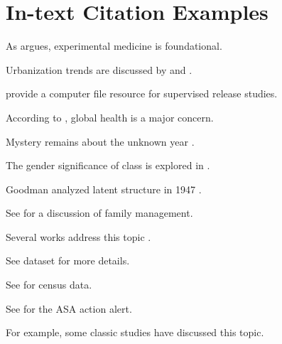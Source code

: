 \documentclass{article}
\begin{document}
\nocite{*} %


\section*{In-text Citation Examples}

As \textcite{bernard1957} argues, experimental medicine is foundational.

Urbanization trends are discussed by \textcite{lee2021a} and \textcite{lee2021b}.

\textcite{deschenes2000} provide a computer file resource for supervised release studies.

According to \textcite{who2022}, global health is a major concern.

Mystery remains about the unknown year \parencite{doe_nodate}.

The gender significance of class is explored in \textcite{szelenyiForthcoming}.

Goodman analyzed latent structure in 1947 \parencite{goodman1947a, goodman1947b}.

See \parencite[pp.~63--93]{sampson1992} for a discussion of family management.

Several works address this topic \parencite{brown2022,kao2003,smith2020a}.

See dataset \textcite{charles1990} for more details.

See \textcite{usbc1960} for census data.

See \textcite{asa1997} for the ASA action alert.

For example, some classic studies \parencite[e.g., ][]{abbott1981,phillips2001} have discussed this topic.


\printbibliography[title={REFERENCES}]
\end{document}
